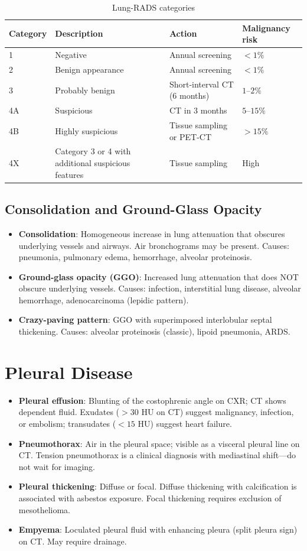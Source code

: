 \begin{table}[h]
\centering
\caption{Lung-RADS categories}
\begin{tabular}{p{2cm} p{4cm} p{3.5cm} p{3cm}}
\hline
\textbf{Category} & \textbf{Description} & \textbf{Action} & \textbf{Malignancy risk} \\
\hline
1 & Negative & Annual screening & $< 1\%$ \\
2 & Benign appearance & Annual screening & $< 1\%$ \\
3 & Probably benign & Short-interval CT (6 months) & $1$--$2\%$ \\
4A & Suspicious & CT in 3 months & $5$--$15\%$ \\
4B & Highly suspicious & Tissue sampling or PET-CT & $> 15\%$ \\
4X & Category 3 or 4 with additional suspicious features & Tissue sampling & High \\
\hline
\end{tabular}
\end{table}

\subsection{Consolidation and Ground-Glass Opacity}
\begin{itemize}
  \item \textbf{Consolidation}: Homogeneous increase in lung attenuation that obscures underlying vessels and airways. Air bronchograms may be present. Causes: pneumonia, pulmonary edema, hemorrhage, alveolar proteinosis.
  \item \textbf{Ground-glass opacity (GGO)}: Increased lung attenuation that does NOT obscure underlying vessels. Causes: infection, interstitial lung disease, alveolar hemorrhage, adenocarcinoma (lepidic pattern).
  \item \textbf{Crazy-paving pattern}: GGO with superimposed interlobular septal thickening. Causes: alveolar proteinosis (classic), lipoid pneumonia, ARDS.
\end{itemize}


\section{Pleural Disease}
\begin{itemize}
  \item \textbf{Pleural effusion}: Blunting of the costophrenic angle on CXR; CT shows dependent fluid. Exudates ($> 30$ HU on CT) suggest malignancy, infection, or embolism; transudates ($< 15$ HU) suggest heart failure.
  \item \textbf{Pneumothorax}: Air in the pleural space; visible as a visceral pleural line on CT. Tension pneumothorax is a clinical diagnosis with mediastinal shift---do not wait for imaging.
  \item \textbf{Pleural thickening}: Diffuse or focal. Diffuse thickening with calcification is associated with asbestos exposure. Focal thickening requires exclusion of mesothelioma.
  \item \textbf{Empyema}: Loculated pleural fluid with enhancing pleura (split pleura sign) on CT. May require drainage.
\end{itemize}


